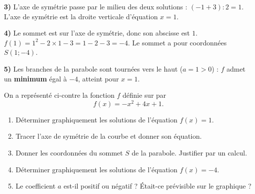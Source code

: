 \documentclass[11pt,a4paper]{book}
\begin{document}
\medskip
\begin{corrBox}
	\textbf{3)} L'axe de symétrie passe par le milieu des deux solutions : $(-1+3):2=1$.\\
	L'axe de symétrie est la droite verticale d'équation $x=1$.
\end{corrBox}

\medskip
\begin{corrBox}
	\textbf{4)} Le sommet est sur l'axe de symétrie, donc son abscisse est $1$.\\
	$f(1)=1^2-2\times1-3=1-2-3=-4$. Le sommet a pour coordonnées $S(1 ; -4)$.
\end{corrBox}

\medskip
\begin{corrBox}
	\textbf{5)} Les branches de la parabole sont tournées vers le haut ($a=1>0$) : $f$ admet un \textbf{minimum} égal à $-4$, atteint pour $x=1$.
\end{corrBox}

\exerciceDS{}

\begin{minipage}[c]{0.5\linewidth}
	On a représenté ci-contre la fonction $f$ définie sur \R par
	$$f(x)=-x^2+4x+1.$$
	\begin{enumerate}[label=\textbf{\arabic*)}]
		\item Déterminer graphiquement les solutions de l'équation $f(x)=1$.
		\item Tracer l'axe de symétrie de la courbe et donner son équation.
		\item Donner les coordonnées du sommet $S$ de la parabole. Justifier par un calcul.
		\item Déterminer graphiquement les solutions de l'équation $f(x)=-4$.
		\item Le coefficient $a$ est-il positif ou négatif ? Était-ce prévisible sur le graphique ?
	\end{enumerate}
\end{minipage} \hfill
\begin{minipage}[c]{0.46\linewidth}
	\begin{center}
	\end{center}
\end{minipage}
\end{document}
